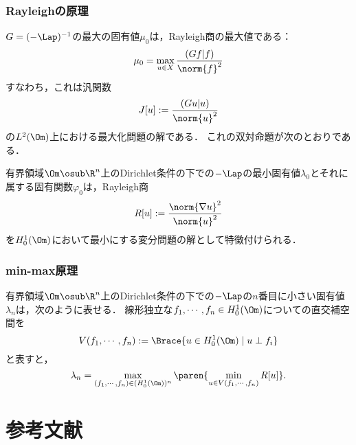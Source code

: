\documentclass[uplatex,dvipdfmx]{jsreport}
\begin{document}
\subsection{Rayleighの原理}

\begin{observation}
    $G=(-\Lap)^{-1}$の最大の固有値$\mu_0$は，Rayleigh商の最大値である：
    \[\mu_0=\max_{u\in X}\frac{(Gf|f)}{\norm{f}^2}\]
    すなわち，これは汎関数
    \[J[u]:=\frac{(Gu|u)}{\norm{u}^2}\]
    の$L^2(\Om)$上における最大化問題の解である．
    これの双対命題が次のとおりである．
\end{observation}

\begin{theorem}
    有界領域$\Om\osub\R^n$上のDirichlet条件の下での$-\Lap$の最小固有値$\lambda_0$とそれに属する固有関数$\varphi_0$は，Rayleigh商
    \[R[u]:=\frac{\norm{\nabla u}^2}{\norm{u}^2}\]
    を$H^1_0(\Om)$において最小にする変分問題の解として特徴付けられる．
\end{theorem}

\subsection{min-max原理}

\begin{theorem}[Courantの最大最小原理]
    有界領域$\Om\osub\R^n$上のDirichlet条件の下での$-\Lap$の$n$番目に小さい固有値$\lambda_n$は，次のように表せる．
    線形独立な$f_1,\cdots,f_n\in H^1_0(\Om)$についての直交補空間を
    \[V(f_1,\cdots,f_n):=\Brace{u\in H^1_0(\Om)\mid u\perp f_i}\]
    と表すと，
    \[\lambda_n=\max_{(f_1,\cdots,f_n)\in (H^1_0(\Om))^n}\paren{\min_{u\in V(f_1,\cdots,f_n)}R[u]}.\]
\end{theorem}

\chapter{参考文献}
\end{document}
